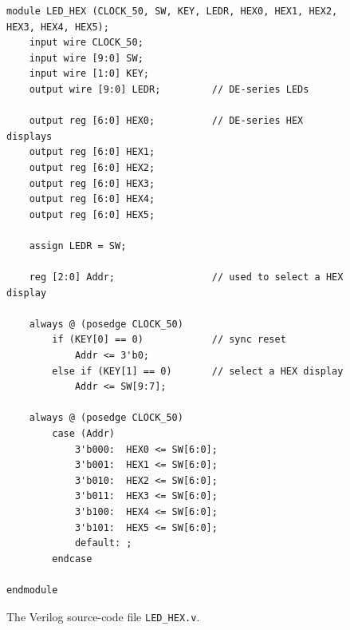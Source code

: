 \documentclass[epsfig,10pt,fullpage]{article} \addtolength{\textwidth}{1.5in}
\begin{document}
\lstset{language=Verilog,numbers=none,escapechar=|}
\begin{figure}[h]
\begin{center}
\begin{minipage}[t]{15 cm}
\begin{lstlisting}[name=addern]
module LED_HEX (CLOCK_50, SW, KEY, LEDR, HEX0, HEX1, HEX2, HEX3, HEX4, HEX5);
    input wire CLOCK_50;
    input wire [9:0] SW;
    input wire [1:0] KEY;
    output wire [9:0] LEDR;         // DE-series LEDs   

    output reg [6:0] HEX0;          // DE-series HEX displays
    output reg [6:0] HEX1;
    output reg [6:0] HEX2;
    output reg [6:0] HEX3;
    output reg [6:0] HEX4;
    output reg [6:0] HEX5;

    assign LEDR = SW;

    reg [2:0] Addr;                 // used to select a HEX display

    always @ (posedge CLOCK_50)
        if (KEY[0] == 0)            // sync reset
            Addr <= 3'b0;
        else if (KEY[1] == 0)       // select a HEX display
            Addr <= SW[9:7];

    always @ (posedge CLOCK_50)
        case (Addr)
            3'b000:  HEX0 <= SW[6:0];
            3'b001:  HEX1 <= SW[6:0];
            3'b010:  HEX2 <= SW[6:0];
            3'b011:  HEX3 <= SW[6:0];
            3'b100:  HEX4 <= SW[6:0];
            3'b101:  HEX5 <= SW[6:0];
            default: ;
        endcase

endmodule
\end{lstlisting}
\end{minipage}
        \caption{The Verilog source-code file \texttt{LED\_HEX.v}.}
\label{fig:top}
\end{center}
\end{figure}
\end{document}
